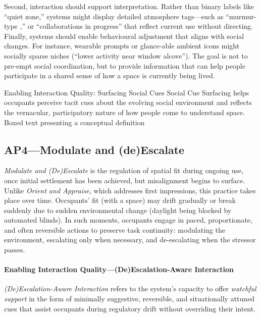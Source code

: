 Second, interaction should support interpretation. Rather than binary labels like “quiet zone,” systems might display detailed atmosphere tags---such as ``murmur-type ,'' or “collaborations in progress” that reflect current use without directing. Finally, systems should enable behavioural adjustment that aligns with social changes. For instance, wearable prompts or glance-able ambient icons might socially sparse niches (``lower activity near window alcove''). The goal is not to pre-empt social coordination, but to provide information that can help people participate in a shared sense of how a space is currently being lived.


\designbox
{Enabling Interaction Quality: Surfacing Social Cues}
{Social Cue Surfacing helps occupants perceive tacit cues about the evolving social environment and reflects the vernacular, participatory nature of how people come to understand space.
}
{Boxed text presenting a conceptual definition}


\subsection{AP4---Modulate and (de)Escalate}
\textit{Modulate and (De)Escalate} is the regulation of spatial fit during ongoing use, once initial settlement has been achieved, but misalignment begins to surface. Unlike \textit{Orient and Appraise}, which addresses first impressions, this practice takes place over time. Occupants' fit (with a space) may drift gradually or break suddenly due to sudden environmental change (daylight being blocked by automated blinds). In such moments, occupants engage in paced, proportionate, and often reversible actions to preserve task continuity: modulating the environment, escalating only when necessary, and de-escalating when the stressor passes.

\paragraph{Enabling Interaction Quality---(De)Escalation-Aware Interaction} 
\textit{(De)Escalation-Aware Interaction} refers to the system’s capacity to offer \textit{watchful support} in the form of minimally suggestive, reversible, and situationally attuned cues that assist occupants during regulatory drift without overriding their intent.

